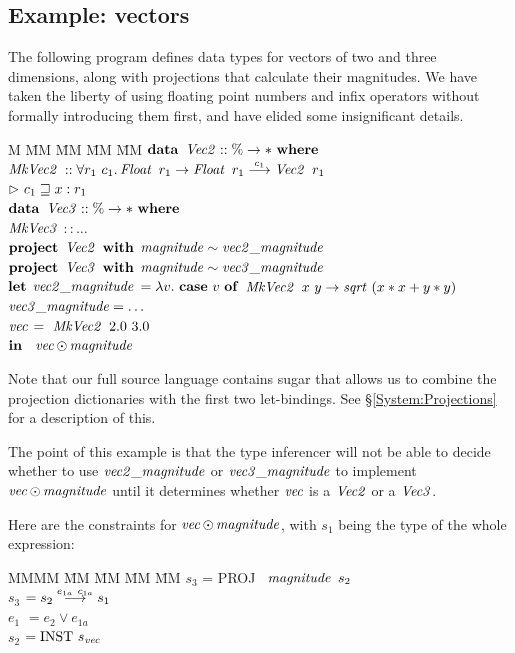 \subsection{Example: vectors}
\label{Inference:Projections:example}

The following program defines data types for vectors of two and three dimensions, along with projections that calculate their magnitudes. We have taken the liberty of using floating point numbers and infix operators without formally introducing them first, and have elided some insignificant details.

\begin{tabbing}
M 	\= MM \= MM \= MM \= MM \kill
	\> $\textrm{\textbf{data}} \ \operatorname{\mathit{Vec2}} :: \% \to * \ \textrm{\textbf{where}}$ \\
	\> \> $\operatorname{\mathit{MkVec2}}$ 	
		\> \> $:: \forall r_1 \ c_1
			. \operatorname{\mathit{Float}} \ r_1 \to \operatorname{\mathit{Float}} \ r_1 \stackrel{c_1}{\longrightarrow} \operatorname{\mathit{Vec2}} \ r_1$ \\
	\> \>			\> \> $\rhd \ c_1 \sqsupseteq x : r_1$ \
	\\[1ex]
	\> $\textrm{\textbf{data}} \ \operatorname{\mathit{Vec3}} :: \% \to * \ \textrm{\textbf{where}}$ \\
	\> \> $\operatorname{\mathit{MkVec3}}$	\> \> $:: \dots$
	\\[1ex]
	\> $\textrm{\textbf{project}} \ \operatorname{\mathit{Vec2}} \ \textrm{\textbf{with}}$ $\operatorname{\mathit{magnitude}} \sim \operatorname{\mathit{vec2\_magnitude}}$ 
	\\[0.5ex]
	\> $\textrm{\textbf{project}} \ \operatorname{\mathit{Vec3}} \ \textrm{\textbf{with}}$ $\operatorname{\mathit{magnitude}} \sim \operatorname{\mathit{vec3\_magnitude}}$
	\\[1ex]
	\> $\textrm{\textbf{let}}$ 
		\> $\operatorname{\mathit{vec2\_magnitude}}$  $= \lambda v. \ \textrm{\textbf{case}} \ v \ \textrm{\textbf{of}}$  $\operatorname{\mathit{MkVec2}} \ x \ y \to \operatorname{\mathit{sqrt}} \ (x * x + y * y)$
	\\[0.5ex]
	\> 	\> $\operatorname{\mathit{vec3\_magnitude}} = \dots$ 
	\\[1ex]
	\>	\> $\operatorname{\mathit{vec}}$ \> $= \ \operatorname{\mathit{MkVec2}} \ 2.0 \ 3.0$ 
	\\[1ex]
	\> $\textrm{\textbf{in}}$ \ $\operatorname{\mathit{vec}} \odot \operatorname{\mathit{magnitude}}$
\end{tabbing}

Note that our full source language contains sugar that allows us to combine the projection dictionaries with the first two let-bindings. See \S\ref{System:Projections} for a description of this.

The point of this example is that the type inferencer will not be able to decide whether to use $\operatorname{\mathit{vec2\_magnitude}}$ or $\operatorname{\mathit{vec3\_magnitude}}$ to implement $\operatorname{\mathit{vec}} \odot \operatorname{\mathit{magnitude}}$ until it determines whether $\operatorname{\mathit{vec}}$ is a $\operatorname{\mathit{Vec2}}$ or a $\operatorname{\mathit{Vec3}}$. 

Here are the constraints for $\operatorname{\mathit{vec}} \odot \operatorname{\mathit{magnitude}}$, with $s_1$ being the type of the whole expression:
\begin{tabbing}
MMMM	\= MM \= MM \= MM \= MM \kill
	\> $s_3$ \> = PROJ \ $\operatorname{\mathit{magnitude}} \ s_2$ \\
	\> $s_3$ \> $= s_2 \stackrel{e_{1a} \ c_{1a}}{\longrightarrow} s_1$ \\
	\> $e_1$ \> $= e_2 \lor e_{1a}$ \\
	\> $s_2$ \> $= \textrm{INST} \ s_{\operatorname{\mathit{vec}}}$
\end{tabbing}

